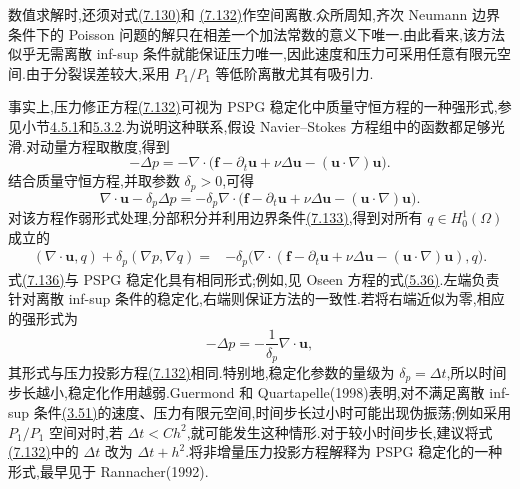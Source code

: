 \begin{note}[空间离散的稳定性]\label{note:projection-spatial-discretization-stability}
数值求解时,还须对式\hyperref[eq:nonincremental-velocity-step]{(7.130)}和
\hyperref[eq:nonincremental-pressure-poisson]{(7.132)}作空间离散.众所周知,齐次 Neumann 边界条件下的 Poisson 问题的解只在相差一个加法常数的意义下唯一.由此看来,该方法似乎无需离散 inf-sup 条件就能保证压力唯一,因此速度和压力可采用任意有限元空间.由于分裂误差较大,采用 $P_1/P_1$ 等低阶离散尤其有吸引力.

事实上,压力修正方程\hyperref[eq:nonincremental-pressure-poisson]{(7.132)}可视为 PSPG 稳定化中质量守恒方程的一种强形式,参见小节\hyperref[sec:stokes-pspg]{4.5.1}和\hyperref[subsec:oseen-spg-stabilization]{5.3.2}.为说明这种联系,假设 Navier--Stokes 方程组中的函数都足够光滑.对动量方程取散度,得到
\[
 -\Delta p=-\nabla\cdot\bigl(
   \bm{f}-\partial_t\bm{u}+\nu\Delta\bm{u}
   -(\bm{u}\cdot\nabla)\bm{u}\bigr).
\]
结合质量守恒方程,并取参数 $\delta_p>0$,可得
\[
 \nabla\cdot\bm{u}-\delta_p\Delta p
 =-\delta_p\nabla\cdot\bigl(
   \bm{f}-\partial_t\bm{u}+\nu\Delta\bm{u}
   -(\bm{u}\cdot\nabla)\bm{u}\bigr).
\]
对该方程作弱形式处理,分部积分并利用边界条件\hyperref[eq:nonincremental-pressure-neumann]{(7.133)},得到对所有 $q\in H_0^1(\Omega)$ 成立的
\begin{equation}\label{eq:projection-pspg-mass-balance}
\begin{aligned}
 (\nabla\cdot\bm{u},q)+\delta_p(\nabla p,\nabla q)
 ={}&-\delta_p\bigl(\nabla\cdot(\bm{f}-\partial_t\bm{u}
   +\nu\Delta\bm{u}-(\bm{u}\cdot\nabla)\bm{u}),q\bigr).
\end{aligned}
\end{equation}
式\hyperref[eq:projection-pspg-mass-balance]{(7.136)}与 PSPG 稳定化具有相同形式;例如,见 Oseen 方程的式\hyperref[eq:oseen-spg-pressure-equation]{(5.36)}.左端负责针对离散 inf-sup 条件的稳定化,右端则保证方法的一致性.若将右端近似为零,相应的强形式为
\[
 -\Delta p=-\frac{1}{\delta_p}\nabla\cdot\bm{u},
\]
其形式与压力投影方程\hyperref[eq:nonincremental-pressure-poisson]{(7.132)}相同.特别地,稳定化参数的量级为 $\delta_p=\Delta t$,所以时间步长越小,稳定化作用越弱.Guermond 和 Quartapelle(1998)表明,对不满足离散 inf-sup 条件\hyperref[eq:discrete-infsup-condition]{(3.51)}的速度、压力有限元空间,时间步长过小时可能出现伪振荡;例如采用 $P_1/P_1$ 空间对时,若 $\Delta t<Ch^2$,就可能发生这种情形.对于较小时间步长,建议将式\hyperref[eq:nonincremental-pressure-poisson]{(7.132)}中的 $\Delta t$ 改为 $\Delta t+h^2$.将非增量压力投影方程解释为 PSPG 稳定化的一种形式,最早见于 Rannacher(1992).
\end{note}

